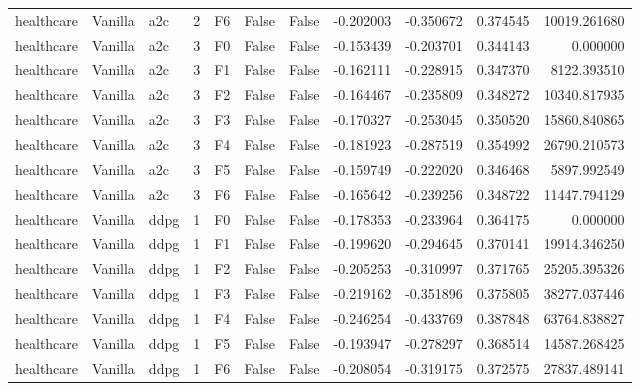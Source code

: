 \begin{tabular}{lllrlllrrrr}
healthcare & Vanilla &       a2c &     2 &  F6 &           False &            False & -0.202003 & -0.350672 & 0.374545 &     10019.261680 \\
healthcare & Vanilla &       a2c &     3 &  F0 &           False &            False & -0.153439 & -0.203701 & 0.344143 &         0.000000 \\
healthcare & Vanilla &       a2c &     3 &  F1 &           False &            False & -0.162111 & -0.228915 & 0.347370 &      8122.393510 \\
healthcare & Vanilla &       a2c &     3 &  F2 &           False &            False & -0.164467 & -0.235809 & 0.348272 &     10340.817935 \\
healthcare & Vanilla &       a2c &     3 &  F3 &           False &            False & -0.170327 & -0.253045 & 0.350520 &     15860.840865 \\
healthcare & Vanilla &       a2c &     3 &  F4 &           False &            False & -0.181923 & -0.287519 & 0.354992 &     26790.210573 \\
healthcare & Vanilla &       a2c &     3 &  F5 &           False &            False & -0.159749 & -0.222020 & 0.346468 &      5897.992549 \\
healthcare & Vanilla &       a2c &     3 &  F6 &           False &            False & -0.165642 & -0.239256 & 0.348722 &     11447.794129 \\
healthcare & Vanilla &      ddpg &     1 &  F0 &           False &            False & -0.178353 & -0.233964 & 0.364175 &         0.000000 \\
healthcare & Vanilla &      ddpg &     1 &  F1 &           False &            False & -0.199620 & -0.294645 & 0.370141 &     19914.346250 \\
healthcare & Vanilla &      ddpg &     1 &  F2 &           False &            False & -0.205253 & -0.310997 & 0.371765 &     25205.395326 \\
healthcare & Vanilla &      ddpg &     1 &  F3 &           False &            False & -0.219162 & -0.351896 & 0.375805 &     38277.037446 \\
healthcare & Vanilla &      ddpg &     1 &  F4 &           False &            False & -0.246254 & -0.433769 & 0.387848 &     63764.838827 \\
healthcare & Vanilla &      ddpg &     1 &  F5 &           False &            False & -0.193947 & -0.278297 & 0.368514 &     14587.268425 \\
healthcare & Vanilla &      ddpg &     1 &  F6 &           False &            False & -0.208054 & -0.319175 & 0.372575 &     27837.489141 \\

\end{tabular}

